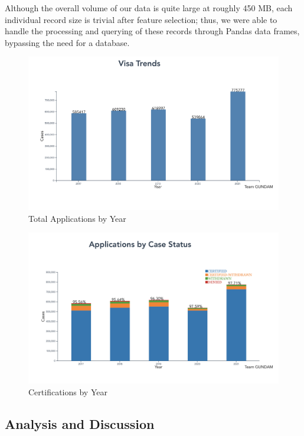\documentclass[sigconf]{acmart}
\begin{document}
Although the overall volume of our data is quite large at roughly 450 MB, 
each individual record size is trivial after feature selection; thus, we 
were able to handle the processing and querying of these records through Pandas data frames, 
bypassing the need for a database. 


\begin{figure}
  \includegraphics[width=\linewidth]{visa_trend.png}
  \caption{Total Applications by Year}
  \label{fig:appsbyyear}
\end{figure}

\begin{figure}
  \includegraphics[width=\linewidth]{case_status_rate.png}
  \caption{Certifications by Year}
  \label{fig:casestatusrate}
\end{figure}



\subsection{Analysis and Discussion}
\end{document}
